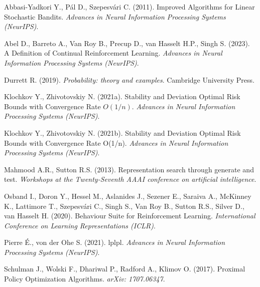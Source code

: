%
{Abbasi{-}Yadkori Y., P{\'{a}}l D., Szepesv{\'{a}}ri C. (2011). Improved Algorithms for Linear Stochastic Bandits. \textit{Advances in Neural Information Processing Systems (NeurIPS)}.}

%
{Abel D., Barreto A., Van Roy B., Precup D., van Hasselt H.P., Singh S. (2023). A Definition of Continual Reinforcement Learning. \textit{Advances in Neural Information Processing Systems (NeurIPS)}.}

%
{Durrett R. (2019). \textit{Probability: theory and examples}. Cambridge University Press.}

%
{Klochkov Y., Zhivotovskiy N. (2021a). Stability and Deviation Optimal Risk Bounds with Convergence Rate $ O (1/n) $. \textit{Advances in Neural Information Processing Systems (NeurIPS)}.}

%
{Klochkov Y., Zhivotovskiy N. (2021b). Stability and Deviation Optimal Risk Bounds with Convergence Rate {\textdollar}O(1/n){\textdollar}. \textit{Advances in Neural Information Processing Systems (NeurIPS)}.}

%
{Mahmood A.R., Sutton R.S. (2013). Representation search through generate and test. \textit{Workshops at the Twenty-Seventh AAAI conference on artificial intelligence}.}

%
{Osband I., Doron Y., Hessel M., Aslanides J., Sezener E., Saraiva A., McKinney K., Lattimore T., Szepesv{\'{a}}ri C., Singh S., Van Roy B., Sutton R.S., Silver D., van Hasselt H. (2020). Behaviour Suite for Reinforcement Learning. \textit{International Conference on Learning Representations (ICLR)}.}

%
{Pierre \'E., von der Ohe S. (2021). lplpl. \textit{Advances in Neural Information Processing Systems (NeurIPS)}.}

%
{Schulman J., Wolski F., Dhariwal P., Radford A., Klimov O. (2017). Proximal Policy Optimization Algorithms. \textit{arXiv: 1707.06347}.}

